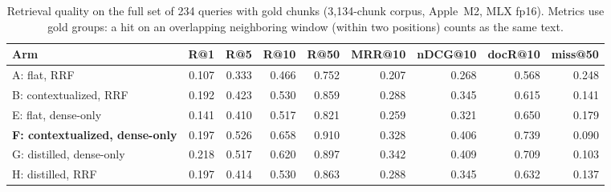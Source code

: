 \begin{table}[t]
\centering
\small
\caption{Retrieval quality on the full set of 234 queries with gold chunks (3{,}134-chunk corpus, Apple~M2, MLX fp16). Metrics use gold groups: a hit on an overlapping neighboring window (within two positions) counts as the same text.}
\label{tab:retrieval}
\footnotesize
\begin{tabular}{lrrrrrrrr}
\toprule
Arm & R@1 & R@5 & R@10 & R@50 & MRR@10 & nDCG@10 & docR@10 & miss@50 \\
\midrule
A: flat, RRF & 0.107 & 0.333 & 0.466 & 0.752 & 0.207 & 0.268 & 0.568 & 0.248 \\
B: contextualized, RRF & 0.192 & 0.423 & 0.530 & 0.859 & 0.288 & 0.345 & 0.615 & 0.141 \\
E: flat, dense-only & 0.141 & 0.410 & 0.517 & 0.821 & 0.259 & 0.321 & 0.650 & 0.179 \\
\textbf{F: contextualized, dense-only} & 0.197 & 0.526 & 0.658 & 0.910 & 0.328 & 0.406 & 0.739 & 0.090 \\
G: distilled, dense-only & 0.218 & 0.517 & 0.620 & 0.897 & 0.342 & 0.409 & 0.709 & 0.103 \\
H: distilled, RRF & 0.197 & 0.414 & 0.530 & 0.863 & 0.288 & 0.345 & 0.632 & 0.137 \\
\bottomrule
\end{tabular}
\end{table}
